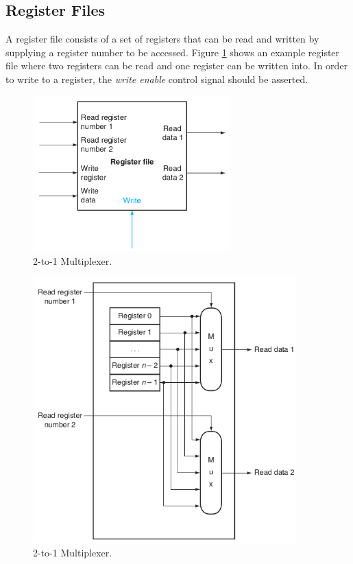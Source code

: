 \documentclass[a4paper, 11pt,oneside]{article}
\begin{document}
\subsection{Register Files}
A register file consists of a set of registers that can be read and written by
supplying a register number to be accessed. Figure \ref{fig:rf0} shows an 
example register file where two registers can be read and one register can be 
written into. In order to write to a register, the \textit{write enable} 
control signal should be asserted.



\begin{figure}[H]
	\begin{center}
	\includegraphics[width=3in]{rf0.png}
	\caption{2-to-1 Multiplexer.}
	\label{fig:rf0} 
	\end{center}
\end{figure}

\begin{figure}[H]
	\begin{center}
	\includegraphics[width=4in]{rf1.png}
	\caption{2-to-1 Multiplexer.}
	\label{fig:mux} 
	\end{center}
\end{figure}
\end{document}
